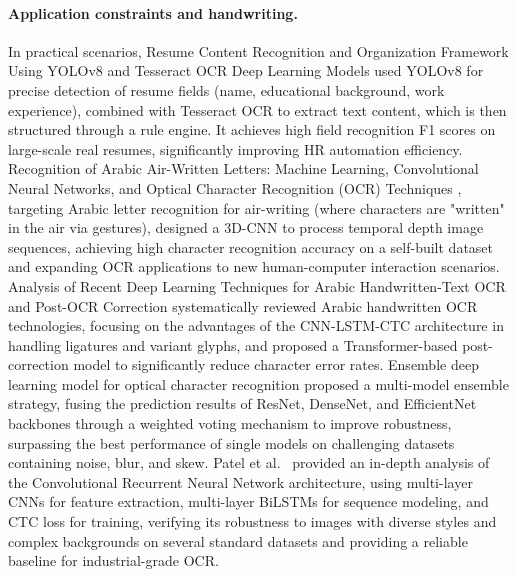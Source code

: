 \paragraph{Application constraints and handwriting.}
In practical scenarios, Resume Content Recognition and Organization Framework Using YOLOv8 and Tesseract OCR Deep Learning Models \cite{sharma2024resume} used YOLOv8 for precise detection of resume fields (name, educational background, work experience), combined with Tesseract OCR to extract text content, which is then structured through a rule engine. It achieves high field recognition F1 scores on large-scale real resumes, significantly improving HR automation efficiency. Recognition of Arabic Air-Written Letters: Machine Learning, Convolutional Neural Networks, and Optical Character Recognition (OCR) Techniques \cite{alsheikh2023airwriting}, targeting Arabic letter recognition for air-writing (where characters are "written" in the air via gestures), designed a 3D-CNN to process temporal depth image sequences, achieving high character recognition accuracy on a self-built dataset and expanding OCR applications to new human-computer interaction scenarios. Analysis of Recent Deep Learning Techniques for Arabic Handwritten-Text OCR and Post-OCR Correction \cite{elhoseiny2023arabic} systematically reviewed Arabic handwritten OCR technologies, focusing on the advantages of the CNN-LSTM-CTC architecture in handling ligatures and variant glyphs, and proposed a Transformer-based post-correction model to significantly reduce character error rates. Ensemble deep learning model for optical character recognition \cite{singh2023ensemble} proposed a multi-model ensemble strategy, fusing the prediction results of ResNet, DenseNet, and EfficientNet backbones through a weighted voting mechanism to improve robustness, surpassing the best performance of single models on challenging datasets containing noise, blur, and skew. Patel et al.~\cite{patel2023crnn} provided an in-depth analysis of the Convolutional Recurrent Neural Network architecture, using multi-layer CNNs for feature extraction, multi-layer BiLSTMs for sequence modeling, and CTC loss for training, verifying its robustness to images with diverse styles and complex backgrounds on several standard datasets and providing a reliable baseline for industrial-grade OCR.

